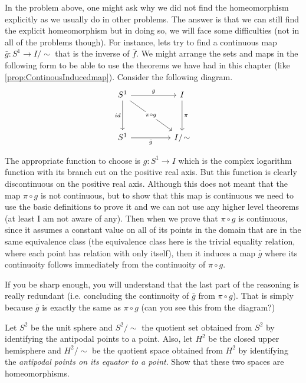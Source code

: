 \begin{observation}
	In the problem above, one might ask why we did not find the homeomorphism explicitly as we usually do in other problems. The answer is that we can still find the explicit homeomorphism but in doing so, we will face some difficulties (not in all of the problems though). For instance, lets try to find a continuous map $ \bar{g}: S^1 \to I/\sim $ that is the inverse of $ \bar{f} $. We might arrange the sets and maps in the following form to be able to use the theorems we have had in this chapter (like \autoref{prop:ContinousInducedmap}). Consider the following diagram.
	\[\begin{tikzcd}
		{S^1} && I \\
		\\
		{S^1} && {I/\sim}
		\arrow["g", from=1-1, to=1-3]
		\arrow["id"', from=1-1, to=3-1]
		\arrow["{\pi\circ g}"{description}, from=1-1, to=3-3]
		\arrow["\pi", from=1-3, to=3-3]
		\arrow["{\bar{g}}"', from=3-1, to=3-3]
	\end{tikzcd}\]
	
	The appropriate function to choose is $ g:S^1\to I $ which is the complex logarithm function with its branch cut on the positive real axis. But this function is clearly discontinuous on the positive real axis. Although this does not meant that the map $ \pi\circ g $ is not continuous, but to show that this map is continuous we need to use the basic definitions to prove it and we can not use any higher level theorems (at least I am not aware of any). Then when we prove that $ \pi\circ g $ is continuous, since it assumes a constant value on all of its points in the domain that are in the same equivalence class (the equivalence class here is the trivial equality relation, where each point has relation with only itself), then it induces a map $ \bar{g} $ where its continuoity follows immediately from the continuoity of $ \pi\circ g $.
	
	If you be sharp enough, you will understand that the last part of the reasoning is really redundant (i.e. concluding the continuoity of $ \bar{g} $ from $ \pi\circ g $). That is simply because $ \bar{g} $ is exactly the same as $ \pi\circ g $ (can you see this from the diagram?)
\end{observation}

\begin{problem}
	\label{prob:H2HomoS^2Sim}
	Let $ S^2 $ be the unit sphere and $ S^2/\sim $ the quotient set obtained from $ S^2 $ by identifying the antipodal points to a point. Also, let $ H^2 $ be the closed upper hemisphere and $ H^2/\sim $ be the quotient space obtained from $ H^2 $ by identifying the \emph{antipodal points on its equator to a point}. Show that these two spaces are homeomorphisms.
\end{problem}

